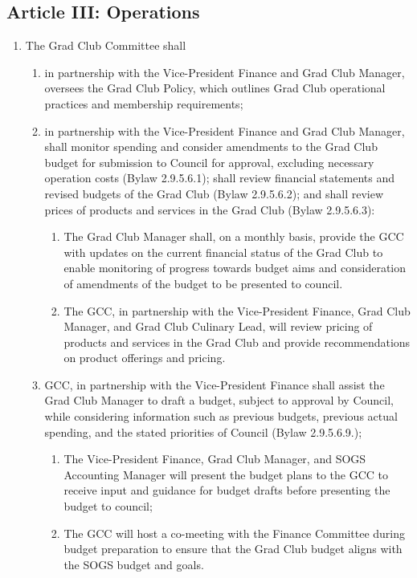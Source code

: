 \subsection{Article III: Operations}
\begin{enumerate}[label*=\arabic*., align=left]	
\item The Grad Club Committee shall
\begin{enumerate}[label*=\arabic*., align=left]	
\item in partnership with the Vice-President Finance and Grad Club Manager, oversees the Grad Club Policy, which outlines Grad Club operational practices and membership requirements;
\item in partnership with the Vice-President Finance and Grad Club Manager, shall monitor spending and consider amendments to the Grad Club budget for submission to Council for approval, excluding necessary operation costs (Bylaw 2.9.5.6.1); shall review financial statements and revised budgets of the Grad Club (Bylaw 2.9.5.6.2); and shall review prices of products and services in the Grad Club (Bylaw 2.9.5.6.3):
\begin{enumerate}[label*=\arabic*., align=left]
\item The Grad Club Manager shall, on a monthly basis, provide the GCC with updates on the current financial status of the Grad Club to enable monitoring of progress towards budget aims and consideration of amendments of the budget to be presented to council.
\item The GCC, in partnership with the Vice-President Finance, Grad Club Manager, and Grad Club Culinary Lead, will review pricing of products and services in the Grad Club and provide recommendations on product offerings and pricing.
\end{enumerate}
\item GCC, in partnership with the Vice-President Finance shall assist the Grad Club Manager to draft a budget, subject to approval by Council, while considering information such as previous budgets, previous actual spending, and the stated priorities of Council (Bylaw 2.9.5.6.9.);
\begin{enumerate}[label*=\arabic*., align=left]
\item The Vice-President Finance, Grad Club Manager, and SOGS Accounting Manager will present the budget plans to the GCC to receive input and guidance for budget drafts before presenting the budget to council;
\item The GCC will host a co-meeting with the Finance Committee during budget preparation to ensure that the Grad Club budget aligns with the SOGS budget and goals.

\end{enumerate}
\end{enumerate}
\end{enumerate}
